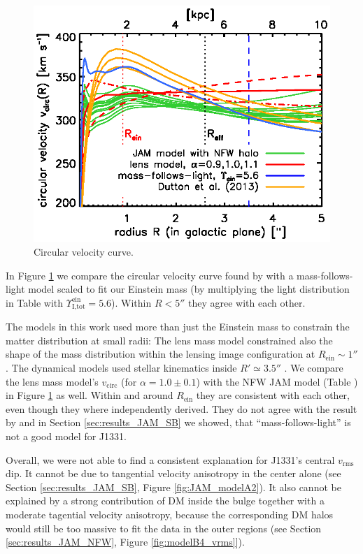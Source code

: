 \begin{figure}
\centering
  \includegraphics[width=0.9\linewidth]{fig/B4_jam_profiles_errors_short_vcirc.ps}
  \caption{Circular velocity curve. }
  \label{fig:vcirc_comparison}
\end{figure}

In Figure \ref{fig:vcirc_comparison} we compare the circular velocity curve found by \citet{SWELLSV} with a mass-follows-light model scaled to fit our Einstein mass (by multiplying the light distribution in Table \Wilma{[TO DO]} with $\Upsilon_\text{I,tot}^\text{ein} = 5.6$). Within $R < 5''$ they agree with each other. 

The models in this work used more than just the Einstein mass to constrain the matter distribution at small radii: The lens mass model constrained also the shape of the mass distribution within the lensing image configuration at $R_\text{ein} \sim 1''$. The dynamical models used stellar kinematics inside $R' \simeq 3.5''$ \Wilma{[TO DO: Check]}. We compare the lens mass model's $v_\text{circ}$ (for $\alpha=1.0\pm 0.1$) with the NFW JAM model (Table \Wilma{[TO DO]}) in Figure \ref{fig:vcirc_comparison} as well. Within and around $R_\text{ein}$ they are consistent with each other, even though they where independently derived. They do not agree with the result by \citet{SWELLSV} and in Section \ref{sec:results_JAM_SB} we showed, that ``mass-follows-light'' is not a good model for J1331.

Overall, we were not able to find a consistent explanation for J1331's central $v_\text{rms}$ dip. It cannot be due to tangential velocity anisotropy in the center alone (see Section \ref{sec:results_JAM_SB}, Figure \ref{fig:JAM_modelA2}). It also cannot be explained by a strong contribution of DM inside the bulge together with a moderate tagential velocity anisotropy, because the corresponding DM halos would still be too massive to fit the data in the outer regions (see Section \ref{sec:results_JAM_NFW}, Figure \ref{fig:modelB4_vrms}]).

